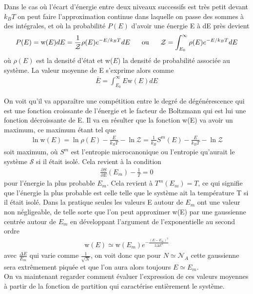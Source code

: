 \documentclass[12pt,prb,aps,epsf]{article}
\begin{document}
Dans le cas où l'écart d'énergie entre deux niveaux successifs est très petit devant $k_BT$ on peut faire l'approximation continue dans laquelle on passe des sommes à des intégrales, et où la probabilité $P(E)$ d'avoir une énergie E à dE près devient
\begin{eqnarray}
P(E) = \mathrm{w}(E)dE = \frac{1}{\mathcal{Z}}\rho(E)e^{-E/k_BT}dE\hspace{0.6cm} \mathrm{ou}\hspace{0.6cm} \mathcal{Z} = \int_{E_0}^{\infty} \rho(E)e^{-E/k_BT}dE
\end{eqnarray}
où $\rho(E)$ est la densité d'état et w($E$) la densité de probabilité associée au système. La valeur moyenne de E s'exprime alors comme
\begin{eqnarray}
\bar{E} = \int_{E_0}^{\infty} E \mathrm{w}(E)dE
\end{eqnarray} 

On voit qu'il va apparaître une compétition entre le degré de dégénérescence qui est une fonction croissante de l'énergie et le facteur de Boltzmann qui est lui une fonction décroissante de E. Il va en résulter que la fonction w(E) va avoir un maximum, ce maximum étant tel que 
\begin{eqnarray}
\ln \mathrm{w}(E) = \ln \rho(E) - \frac{E}{k_BT} - \ln \mathcal{Z} = \frac{1}{k_B}S^m(E) - \frac{E}{k_BT} - \ln \mathcal{Z}
\end{eqnarray}
soit maximum, où $S^m$ est l'entropie microcanonique ou l'entropie qu'aurait le système $\mathcal{S}$ si il était isolé. Cela revient à la condition 
\begin{eqnarray}
\frac{\partial S}{\partial E}(E_m) - \frac{1}{T} = 0
\end{eqnarray}
pour l'énergie la plus probable $E_m$. Cela revient à $T^m(E_m) = T$, ce qui signifie que l'énergie la plus probable est celle telle que le système ait la température T si il était isolé. Dans la pratique seules les valeurs E autour de $E_m$ ont une valeur non négligeable, de telle sorte que l'on peut approximer w(E) par une gaussienne centrée autour de $E_m$ en développant l'argument de l'exponentielle au second ordre 
\begin{eqnarray}
\mathrm{w}(E) \simeq \mathrm{w}(E_m)e^{-\frac{(E-E_m)^2}{2\Delta E^2}}
\end{eqnarray}
avec $\frac{\Delta E}{E_m}$ qui varie comme $\frac{1}{\sqrt{N}}$, on voit donc que pour $N\simeq \mathcal{N}_A$ cette gaussienne sera extrêmement piquée et que l'on aura alors toujours $E\simeq E_m$.\\
On va maintenant regarder comment évaluer l'expression de ces valeurs moyennes à partir de la fonction de partition qui caractérise entièrement le système.
\end{document}

